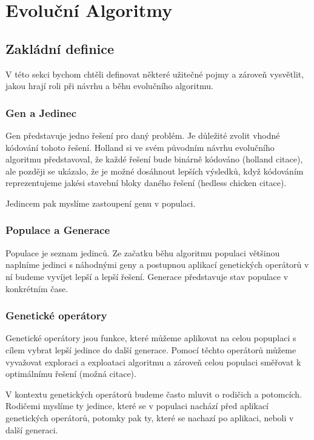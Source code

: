 \chapter{Evoluční Algoritmy}


\section{Zakládní definice}
V této sekci bychom chtěli definovat některé užitečné pojmy a zároveň vysvětlit, jakou hrají roli při návrhu a běhu evolučního algoritmu.

\subsection{Gen a Jedinec}
Gen představuje jedno řešení pro daný problém. Je důležité zvolit vhodné kódování tohoto řešení. Holland si ve svém původním návrhu evolučního algoritmu představoval, že každé řešení bude binárně kódováno (holland citace), ale později se ukázalo, že je možné dosáhnout lepších výsledků, když kódováním reprezentujeme jakési stavební bloky daného řešení (hedless chicken citace).

Jedincem pak myslíme zastoupení genu v populaci.

\subsection{Populace a Generace}
Populace je seznam jedinců. Ze začatku běhu algoritmu populaci většinou naplníme jedinci s náhodnými geny a postupnou aplikací genetických operátorů v ní budeme vyvíjet lepší a lepší řešení. Generace představuje stav populace v konkrétním čase.

\subsection{Genetické operátory}
Genetické operátory jsou funkce, které můžeme aplikovat na celou popuplaci s cílem vybrat lepší jedince do další generace. Pomocí těchto operátorů můžeme vyvažovat exploraci a exploataci algoritmu a zároveň celou populaci směřovat k optimálnímu řešení (možná citace).

V kontextu genetických operátorů budeme často mluvit o rodičich a potomcích. Rodičemi myslíme ty jedince, které se v populaci nachází před aplikací genetických operátorů, potomky pak ty, které se nachazí po aplikaci, neboli v další generaci. 

